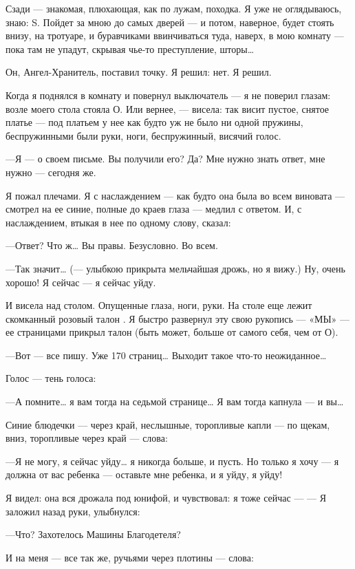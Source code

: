 \documentclass[11pt,openany]{book}
\begin{document}
Сзади --- знакомая, плюхающая, как по лужам, походка. Я уже не оглядываюсь, знаю: S. Пойдет за мною до самых дверей --- и потом, наверное, будет стоять внизу, на тротуаре, и буравчиками ввинчиваться туда, наверх, в мою комнату --- пока там не упадут, скрывая чье-то преступление, шторы\ldots{}

Он, Ангел-Хранитель, поставил точку. Я решил: нет. Я решил.

Когда я поднялся в комнату и повернул выключатель --- я не поверил глазам: возле моего стола стояла О. Или вернее, --- висела: так висит пустое, снятое платье --- под платьем у нее как будто уж не было ни одной пружины, беспружинными были руки, ноги, беспружинный, висячий голос.

---Я --- о своем письме. Вы получили его? Да? Мне нужно знать ответ, мне нужно --- сегодня же.

Я пожал плечами. Я с наслаждением --- как будто она была во всем виновата --- смотрел на ее синие, полные до краев глаза --- медлил с ответом. И, с наслаждением, втыкая в нее по одному слову, сказал:

---Ответ? Что ж\ldots{} Вы правы. Безусловно. Во всем.

---Так значит\ldots{} (--- улыбкою прикрыта мельчайшая дрожь, но я вижу.) Ну, очень хорошо! Я сейчас --- я сейчас уйду.

И висела над столом. Опущенные глаза, ноги, руки. На столе еще лежит скомканный розовый талон . Я быстро развернул эту свою рукопись --- «МЫ» --- ее страницами прикрыл талон (быть может, больше от самого себя, чем от О).

---Вот --- все пишу. Уже 170 страниц\ldots{} Выходит такое что-то неожиданное\ldots{}

Голос --- тень голоса:

---А помните\ldots{} я вам тогда на седьмой странице\ldots{} Я вам тогда капнула --- и вы\ldots{}

Синие блюдечки --- через край, неслышные, торопливые капли --- по щекам, вниз, торопливые через край --- слова:

---Я не могу, я сейчас уйду\ldots{} я никогда больше, и пусть. Но только я хочу --- я должна от вас ребенка --- оставьте мне ребенка, и я уйду, я уйду!

Я видел: она вся дрожала под юнифой, и чувствовал: я тоже сейчас --- --- Я заложил назад руки, улыбнулся:

---Что? Захотелось Машины Благодетеля?

И на меня --- все так же, ручьями через плотины --- слова:
\end{document}
